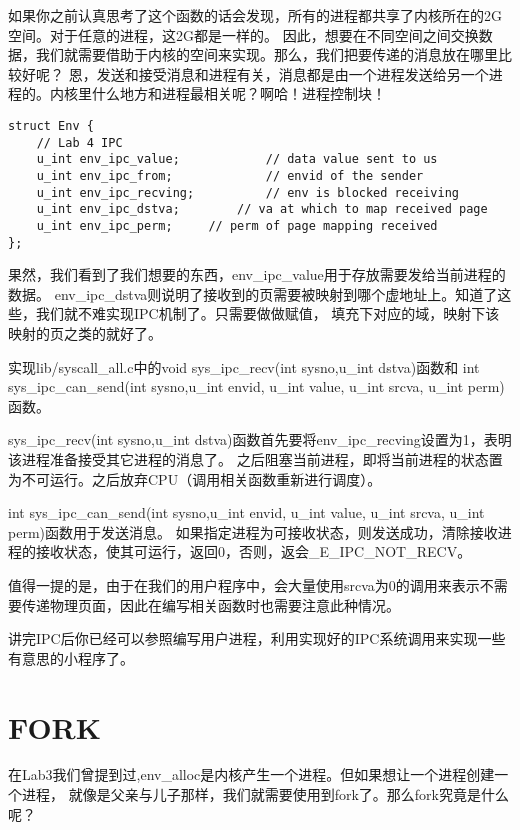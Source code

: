 如果你之前认真思考了这个函数的话会发现，所有的进程都共享了内核所在的2G空间。对于任意的进程，这2G都是一样的。
因此，想要在不同空间之间交换数据，我们就需要借助于内核的空间来实现。那么，我们把要传递的消息放在哪里比较好呢？
恩，发送和接受消息和进程有关，消息都是由一个进程发送给另一个进程的。内核里什么地方和进程最相关呢？啊哈！进程控制块！

\begin{verbatim}
struct Env {
    // Lab 4 IPC
    u_int env_ipc_value;            // data value sent to us
    u_int env_ipc_from;             // envid of the sender
    u_int env_ipc_recving;          // env is blocked receiving
    u_int env_ipc_dstva;        // va at which to map received page
    u_int env_ipc_perm;     // perm of page mapping received
};
\end{verbatim}

果然，我们看到了我们想要的东西，env\_ipc\_value用于存放需要发给当前进程的数据。
env\_ipc\_dstva则说明了接收到的页需要被映射到哪个虚地址上。知道了这些，我们就不难实现IPC机制了。只需要做做赋值，
填充下对应的域，映射下该映射的页之类的就好了。

\begin{exercise}
实现lib/syscall\_all.c中的void sys\_ipc\_recv(int sysno,u\_int dstva)函数和
int sys\_ipc\_can\_send(int sysno,u\_int envid, u\_int value, u\_int srcva, u\_int perm)函数。
\end{exercise}

sys\_ipc\_recv(int sysno,u\_int dstva)函数首先要将env\_ipc\_recving设置为1，表明该进程准备接受其它进程的消息了。
之后阻塞当前进程，即将当前进程的状态置为不可运行。之后放弃CPU（调用相关函数重新进行调度）。

int sys\_ipc\_can\_send(int sysno,u\_int envid, u\_int value, u\_int srcva, u\_int perm)函数用于发送消息。
如果指定进程为可接收状态，则发送成功，清除接收进程的接收状态，使其可运行，返回0，否则，返会\_E\_IPC\_NOT\_RECV。

值得一提的是，由于在我们的用户程序中，会大量使用srcva为0的调用来表示不需要传递物理页面，因此在编写相关函数时也需要注意此种情况。

讲完IPC后你已经可以参照编写用户进程，利用实现好的IPC系统调用来实现一些有意思的小程序了。

\section{FORK}

在Lab3我们曾提到过,env\_alloc是内核产生一个进程。但如果想让一个进程创建一个进程，
就像是父亲与儿子那样，我们就需要使用到fork了。那么fork究竟是什么呢？

